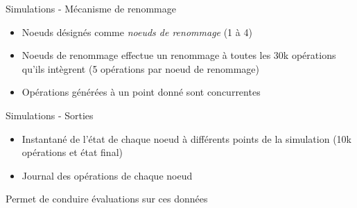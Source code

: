 \begin{frame}{Simulations - Mécanisme de renommage}
  \begin{itemize}
    \item Noeuds désignés comme \emph{noeuds de renommage} (1 à 4)
    \item Noeuds de renommage effectue un renommage à toutes les 30k opérations qu'ils intègrent (5 opérations \ren par noeud de renommage)
    \item Opérations \ren générées à un point donné sont \alert{concurrentes}
  \end{itemize}
\end{frame}

\begin{frame}{Simulations - Sorties}
  \begin{itemize}
    \item Instantané de l'état de chaque noeud à différents points de la simulation (10k opérations et état final)
    \item Journal des opérations de chaque noeud
  \end{itemize}
  \pause
  \begin{center}
    \alert{Permet de conduire évaluations sur ces données}
  \end{center}
\end{frame}
